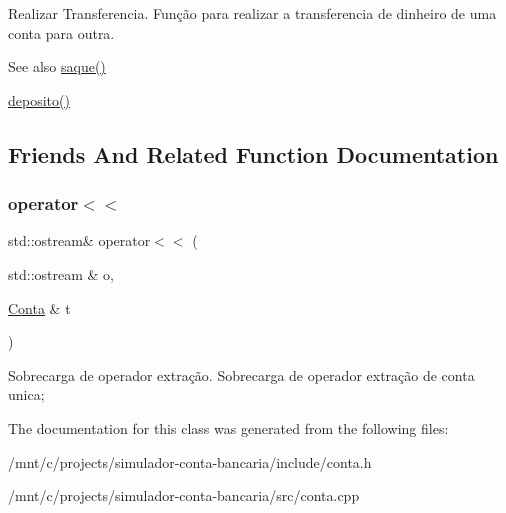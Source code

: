Realizar Transferencia. Função para realizar a transferencia de dinheiro de uma conta para outra. \begin{DoxySeeAlso}{See also}
\hyperlink{classConta_a27d1541cad3d26df35ca230d6640cc85}{saque()} 

\hyperlink{classConta_a1b6603aa8a3f0f667fae304521ab617e}{deposito()} 
\end{DoxySeeAlso}


\subsection{Friends And Related Function Documentation}
\mbox{\label{classConta_a0a72b144512bab26faac4766f3305d59}} 
\subsubsection{\texorpdfstring{operator$<$$<$}{operator<<}}
{\footnotesize\ttfamily std\+::ostream\& operator$<$$<$ (\begin{DoxyParamCaption}\item[{std\+::ostream \&}]{o,  }\item[{\hyperlink{classConta}{Conta} \&}]{t }\end{DoxyParamCaption})\hspace{0.3cm}{\ttfamily [friend]}}

Sobrecarga de operador extração. Sobrecarga de operador extração de conta unica; 

The documentation for this class was generated from the following files\+:\begin{DoxyCompactItemize}
\item 
/mnt/c/projects/simulador-\/conta-\/bancaria/include/conta.\+h\item 
/mnt/c/projects/simulador-\/conta-\/bancaria/src/conta.\+cpp\end{DoxyCompactItemize}
